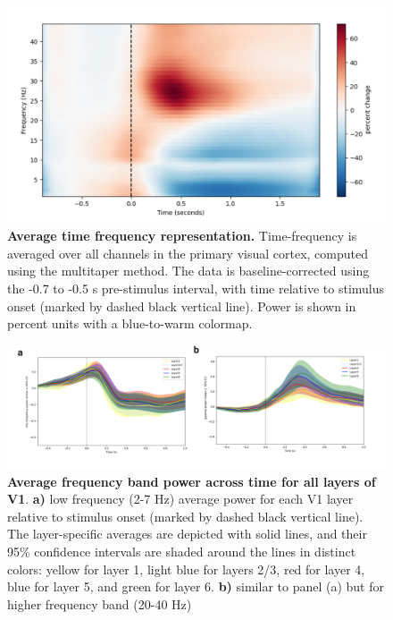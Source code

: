 \documentclass[
  letterpaper,
  DIV=11,
  numbers=noendperiod]{scrartcl}
\begin{document}
\begin{figure}[H]

{\centering \includegraphics[width=7.30208in,height=\textheight]{images/TF.png}

}

\caption{\textbf{Average time frequency representation.} Time-frequency
is averaged over all channels in the primary visual cortex, computed
using the multitaper method. The data is baseline-corrected using the
-0.7 to -0.5 s pre-stimulus interval, with time relative to stimulus
onset (marked by dashed black vertical line). Power is shown in percent
units with a blue-to-warm colormap.}

\end{figure}%
\begin{figure}[H]

{\centering \includegraphics{images/layer_power.png}

}

\caption{\textbf{Average frequency band power across time for all layers
of V1}. \textbf{a)} low frequency (2-7 Hz) average power for each V1
layer relative to stimulus onset (marked by dashed black vertical line).
The layer-specific averages are depicted with solid lines, and their
95\% confidence intervals are shaded around the lines in distinct
colors: yellow for layer 1, light blue for layers 2/3, red for layer 4,
blue for layer 5, and green for layer 6. \textbf{b)} similar to panel
(a) but for higher frequency band (20-40 Hz)}

\end{figure}%
\end{document}
